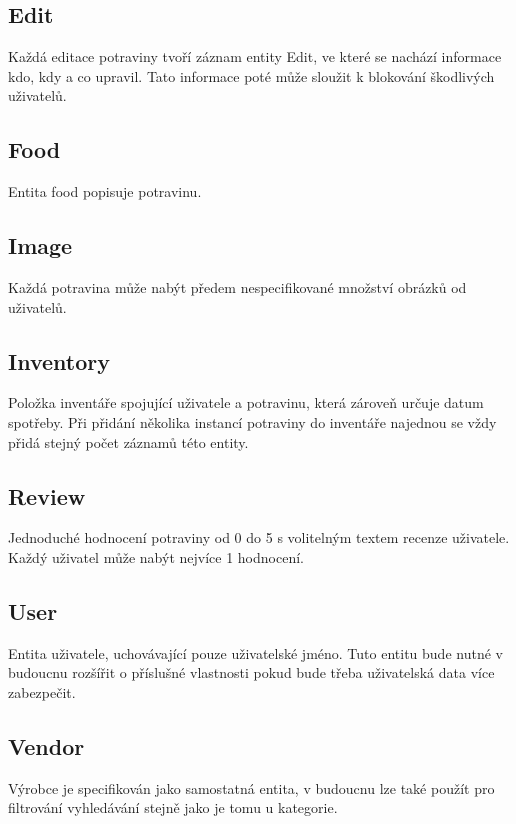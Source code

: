 \documentclass[thesis=B,czech]{FITthesis}[2013/10/20]
\begin{document}
\subsection{Edit}
Každá editace potraviny tvoří záznam entity Edit, ve které se nachází informace kdo, kdy a co upravil. Tato informace poté může sloužit k blokování škodlivých uživatelů.

\subsection{Food}
Entita food popisuje potravinu.

\subsection{Image}
Každá potravina může nabýt předem nespecifikované množství obrázků od uživatelů.

\subsection{Inventory}
Položka inventáře spojující uživatele a potravinu, která zároveň určuje datum spotřeby. Při přidání několika instancí potraviny do inventáře najednou se vždy přidá stejný počet záznamů této entity.

\subsection{Review}
Jednoduché hodnocení potraviny od 0 do 5 s volitelným textem recenze uživatele. Každý uživatel může nabýt nejvíce 1 hodnocení.

\subsection{User}
Entita uživatele, uchovávající pouze uživatelské jméno. Tuto entitu bude nutné v budoucnu rozšířit o příslušné vlastnosti pokud bude třeba uživatelská data více zabezpečit.

\subsection{Vendor}
Výrobce je specifikován jako samostatná entita, v budoucnu lze také použít pro filtrování vyhledávání stejně jako je tomu u kategorie.
\end{document}
